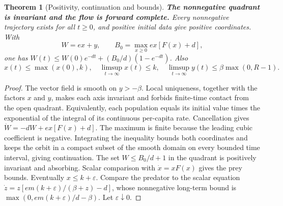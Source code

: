 \documentclass[12pt,a4paper,twoside,fleqn]{article}
\theoremstyle{journal}
\newtheorem{theorem}{Theorem}
\newcommand{\claim}[1]{{\normalfont\bfseries\boldmath #1}}
\begin{document}
\begin{theorem}[Positivity, continuation and bounds]\label{thm:bounds}
\claim{The nonnegative quadrant is invariant and the flow is forward complete.} Every nonnegative trajectory exists for all \(t\ge0\), and positive initial data give positive coordinates. With
\[
 W=ex+y,\qquad B_0=\max_{x\ge0} ex[F(x)+d],
\]
one has \(W(t)\le W(0)e^{-dt}+(B_0/d)(1-e^{-dt})\). Also
\[
 x(t)\le\max(x(0),k),\quad \limsup_{t\to\infty}x(t)\le k,\quad
 \limsup_{t\to\infty}y(t)\le\beta\max(0,R-1).
\]
\end{theorem}
\begin{proof}
The vector field is smooth on \(y>-\beta\). Local uniqueness, together with the factors \(x\) and \(y\), makes each axis invariant and forbids finite-time contact from the open quadrant. Equivalently, each population equals its initial value times the exponential of the integral of its continuous per-capita rate. Cancellation gives \(\dot W=-dW+ex[F(x)+d]\). The maximum is finite because the leading cubic coefficient is negative. Integrating the inequality bounds both coordinates and keeps the orbit in a compact subset of the smooth domain on every bounded time interval, giving continuation. The set \(W\le B_0/d+1\) in the quadrant is positively invariant and absorbing. Scalar comparison with \(\dot x=xF(x)\) gives the prey bounds. Eventually \(x\le k+\varepsilon\). Compare the predator to the scalar equation \(\dot z=z[em(k+\varepsilon)/(\beta+z)-d]\), whose nonnegative long-term bound is \(\max(0,em(k+\varepsilon)/d-\beta)\). Let \(\varepsilon\downarrow0\).
\end{proof}
\end{document}
